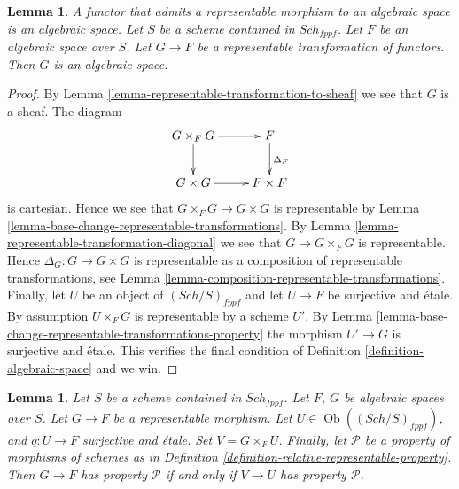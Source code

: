 \documentclass{stacks-project}
\newenvironment{slogan}{\comment}{\endcomment}
\theoremstyle{plain}
\newtheorem{lemma}[subsection]{Lemma}
\theoremstyle{definition}
\theoremstyle{remark}
\numberwithin{equation}{subsection}
\def\Sch{\mathit{Sch}}
\def\Ob{\mathop{\mathrm{Ob}}\nolimits}
\begin{document}
\begin{lemma}
\label{lemma-representable-over-space}
\begin{slogan}
A functor that admits a representable morphism to an algebraic space is
an algebraic space.
\end{slogan}
Let $S$ be a scheme contained in $\Sch_{fppf}$.
Let $F$ be an algebraic space over $S$.
Let $G \to F$ be a representable transformation of functors.
Then $G$ is an algebraic space.
\end{lemma}

\begin{proof}
By Lemma \ref{lemma-representable-transformation-to-sheaf}
we see that $G$ is a sheaf. The diagram
$$
\xymatrix{
G \times_F G \ar[r] \ar[d] & F \ar[d]^{\Delta_F} \\
G \times G \ar[r] & F \times F
}
$$
is cartesian. Hence we see that $G \times_F G \to G \times G$
is representable by
Lemma \ref{lemma-base-change-representable-transformations}.
By
Lemma \ref{lemma-representable-transformation-diagonal}
we see that $G \to G \times_F G$ is representable.
Hence $\Delta_G : G \to G \times G$ is representable as a composition
of representable transformations, see
Lemma \ref{lemma-composition-representable-transformations}.
Finally, let $U$ be an object of $(\Sch/S)_{fppf}$
and let $U \to F$ be surjective and \'etale. By assumption
$U \times_F G$ is representable by a scheme $U'$. By
Lemma \ref{lemma-base-change-representable-transformations-property}
the morphism $U' \to G$ is surjective and \'etale. This verifies
the final condition of Definition \ref{definition-algebraic-space} and we win.
\end{proof}

\begin{lemma}
\label{lemma-representable-morphisms-spaces-property}
Let $S$ be a scheme contained in $\Sch_{fppf}$.
Let $F$, $G$ be algebraic spaces over $S$.
Let $G \to F$ be a representable morphism.
Let $U \in \Ob((\Sch/S)_{fppf})$, and $q : U \to F$
surjective and \'etale. Set $V = G \times_F U$.
Finally, let $\mathcal{P}$ be a property of morphisms
of schemes as in Definition \ref{definition-relative-representable-property}.
Then $G \to F$ has property $\mathcal{P}$ if and only if
$V \to U$ has property $\mathcal{P}$.
\end{lemma}
\end{document}
